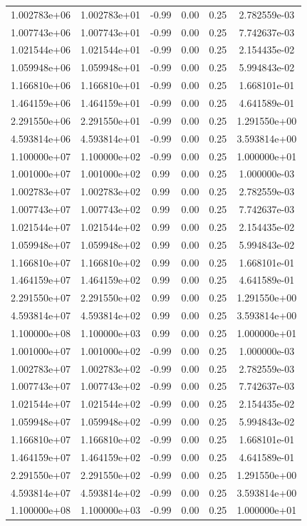 \documentclass{article}
\begin{document}
\begin{table}[htbp]
\begin{tabular}{cccccc}
1.002783e+06 & 1.002783e+01 & -0.99 & 0.00 & 0.25 & 2.782559e-03 \\
1.007743e+06 & 1.007743e+01 & -0.99 & 0.00 & 0.25 & 7.742637e-03 \\
1.021544e+06 & 1.021544e+01 & -0.99 & 0.00 & 0.25 & 2.154435e-02 \\
1.059948e+06 & 1.059948e+01 & -0.99 & 0.00 & 0.25 & 5.994843e-02 \\
1.166810e+06 & 1.166810e+01 & -0.99 & 0.00 & 0.25 & 1.668101e-01 \\
1.464159e+06 & 1.464159e+01 & -0.99 & 0.00 & 0.25 & 4.641589e-01 \\
2.291550e+06 & 2.291550e+01 & -0.99 & 0.00 & 0.25 & 1.291550e+00 \\
4.593814e+06 & 4.593814e+01 & -0.99 & 0.00 & 0.25 & 3.593814e+00 \\
1.100000e+07 & 1.100000e+02 & -0.99 & 0.00 & 0.25 & 1.000000e+01 \\
1.001000e+07 & 1.001000e+02 & 0.99 & 0.00 & 0.25 & 1.000000e-03 \\
1.002783e+07 & 1.002783e+02 & 0.99 & 0.00 & 0.25 & 2.782559e-03 \\
1.007743e+07 & 1.007743e+02 & 0.99 & 0.00 & 0.25 & 7.742637e-03 \\
1.021544e+07 & 1.021544e+02 & 0.99 & 0.00 & 0.25 & 2.154435e-02 \\
1.059948e+07 & 1.059948e+02 & 0.99 & 0.00 & 0.25 & 5.994843e-02 \\
1.166810e+07 & 1.166810e+02 & 0.99 & 0.00 & 0.25 & 1.668101e-01 \\
1.464159e+07 & 1.464159e+02 & 0.99 & 0.00 & 0.25 & 4.641589e-01 \\
2.291550e+07 & 2.291550e+02 & 0.99 & 0.00 & 0.25 & 1.291550e+00 \\
4.593814e+07 & 4.593814e+02 & 0.99 & 0.00 & 0.25 & 3.593814e+00 \\
1.100000e+08 & 1.100000e+03 & 0.99 & 0.00 & 0.25 & 1.000000e+01 \\
1.001000e+07 & 1.001000e+02 & -0.99 & 0.00 & 0.25 & 1.000000e-03 \\
1.002783e+07 & 1.002783e+02 & -0.99 & 0.00 & 0.25 & 2.782559e-03 \\
1.007743e+07 & 1.007743e+02 & -0.99 & 0.00 & 0.25 & 7.742637e-03 \\
1.021544e+07 & 1.021544e+02 & -0.99 & 0.00 & 0.25 & 2.154435e-02 \\
1.059948e+07 & 1.059948e+02 & -0.99 & 0.00 & 0.25 & 5.994843e-02 \\
1.166810e+07 & 1.166810e+02 & -0.99 & 0.00 & 0.25 & 1.668101e-01 \\
1.464159e+07 & 1.464159e+02 & -0.99 & 0.00 & 0.25 & 4.641589e-01 \\
2.291550e+07 & 2.291550e+02 & -0.99 & 0.00 & 0.25 & 1.291550e+00 \\
4.593814e+07 & 4.593814e+02 & -0.99 & 0.00 & 0.25 & 3.593814e+00 \\
1.100000e+08 & 1.100000e+03 & -0.99 & 0.00 & 0.25 & 1.000000e+01 \\
\hline
\end{tabular}
\end{table}
\end{document}
